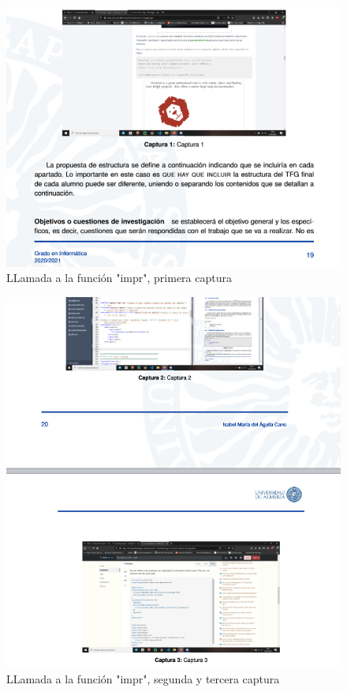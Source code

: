 \documentclass{article}
\begin{document}
\begin{figure}[h!]
\centering
\includegraphics[scale=0.57]{PRUEBA2.PNG}
\caption{LLamada a la función "impr", primera captura}
\label{fig:cap1}
\end{figure}

\begin{figure}[h!]
\centering
\includegraphics[scale=0.65]{PRUEBA3.PNG}
\caption{LLamada a la función "impr", segunda y tercera captura}
\label{fig:cap1}
\end{figure}
\end{document}
